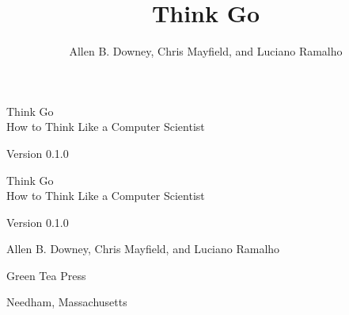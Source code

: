 \documentclass[12pt]{book}
\title{Think Go}
\author{Allen B. Downey, Chris Mayfield, and Luciano Ramalho}
\newcommand{\thetitle}{Think Go}
\newcommand{\thesubtitle}{How to Think Like a Computer Scientist}
\newcommand{\theauthors}{Allen B. Downey, Chris Mayfield, and Luciano Ramalho}
\newcommand{\theversion}{0.1.0}
\theoremstyle{exercise}
\newif\ifplastex
\begin{document}
\frontmatter

\ifplastex

\maketitle

\else

\begin{latexonly}

\thispagestyle{empty}

\begin{flushright}
\vspace*{2.0in}

\begin{spacing}{3}
{\huge \thetitle} \\
{\Large \thesubtitle}
\end{spacing}

\vspace{0.25in}

Version \theversion

\vfill
\end{flushright}

\newpage
\thispagestyle{empty}

\quad

\newpage
\thispagestyle{empty}

\begin{flushright}
\vspace*{2.0in}

\begin{spacing}{3}
{\huge \thetitle} \\
{\Large \thesubtitle}
\end{spacing}

\vspace{0.25in}

Version \theversion

\vspace{1in}

{\Large \theauthors}

\vspace{0.5in}

{\Large Green Tea Press}

{\small Needham, Massachusetts}

\vfill
\end{flushright}


\end{latexonly}
\end{document}
